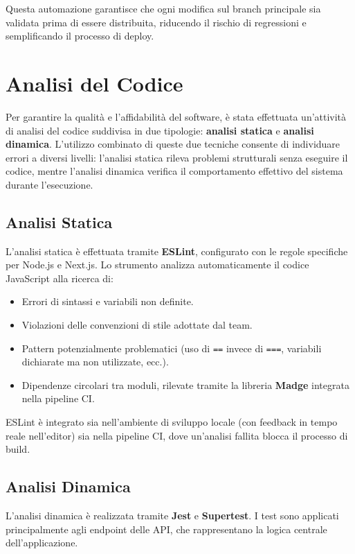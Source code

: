 \documentclass[12pt,a4paper,twoside]{report}
\begin{document}
Questa automazione garantisce che ogni modifica sul branch principale sia validata prima di essere distribuita, riducendo il rischio di regressioni e semplificando il processo di deploy.

\chapter{Analisi del Codice}

Per garantire la qualità e l'affidabilità del software, è stata effettuata un'attività di analisi del codice suddivisa in due tipologie: \textbf{analisi statica} e \textbf{analisi dinamica}. L'utilizzo combinato di queste due tecniche consente di individuare errori a diversi livelli: l'analisi statica rileva problemi strutturali senza eseguire il codice, mentre l'analisi dinamica verifica il comportamento effettivo del sistema durante l'esecuzione.

\section{Analisi Statica}

L'analisi statica è effettuata tramite \textbf{ESLint}, configurato con le regole specifiche per Node.js e Next.js. Lo strumento analizza automaticamente il codice JavaScript alla ricerca di:
\begin{itemize}
  \item Errori di sintassi e variabili non definite.
  \item Violazioni delle convenzioni di stile adottate dal team.
  \item Pattern potenzialmente problematici (uso di \texttt{==} invece di \texttt{===}, variabili dichiarate ma non utilizzate, ecc.).
  \item Dipendenze circolari tra moduli, rilevate tramite la libreria \textbf{Madge} integrata nella pipeline CI.
\end{itemize}

ESLint è integrato sia nell'ambiente di sviluppo locale (con feedback in tempo reale nell'editor) sia nella pipeline CI, dove un'analisi fallita blocca il processo di build.

\section{Analisi Dinamica}

L'analisi dinamica è realizzata tramite \textbf{Jest} e \textbf{Supertest}. I test sono applicati principalmente agli endpoint delle API, che rappresentano la logica centrale dell'applicazione.
\end{document}
